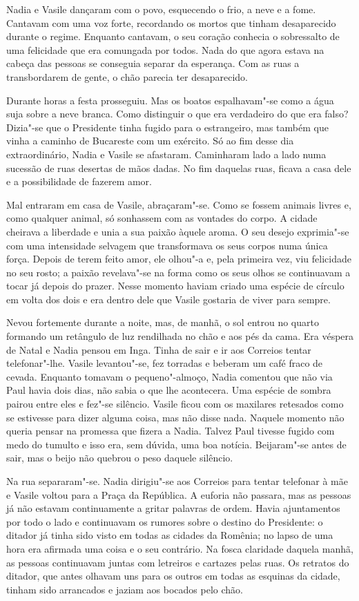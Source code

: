 Nadia e Vasile dançaram com o povo, esquecendo o frio, a neve e a fome.
Cantavam com uma voz forte, recordando os mortos que tinham
desaparecido durante o regime. Enquanto cantavam, o seu coração conhecia
o sobressalto de uma felicidade que era comungada por todos. Nada do que
agora estava na cabeça das pessoas se conseguia separar da esperança.
Com as ruas a transbordarem de gente, o chão parecia ter desaparecido.

Durante horas a festa prosseguiu. Mas os boatos espalhavam"-se como a
água suja sobre a neve branca. Como distinguir o que era verdadeiro do
que era falso? Dizia"-se que o Presidente tinha fugido para o
estrangeiro, mas também que vinha a caminho de Bucareste com um exército. Só ao fim desse dia extraordinário, Nadia e Vasile se afastaram.
Caminharam lado a lado numa sucessão de ruas desertas de mãos dadas. No
fim daquelas ruas, ficava a casa dele e a possibilidade de fazerem amor.

Mal entraram em casa de Vasile, abraçaram"-se. Como se fossem animais
livres e, como qualquer animal, só sonhassem com as vontades do corpo. A
cidade cheirava a liberdade e unia a sua paixão àquele aroma. O seu
desejo exprimia"-se com uma intensidade selvagem que transformava os seus
corpos numa única força. Depois de
terem feito amor, ele olhou"-a e, pela primeira vez, viu felicidade no
seu rosto; a paixão revelava"-se na forma como os seus olhos se
continuavam a tocar já depois do prazer. Nesse momento haviam criado uma
espécie de círculo em volta dos dois e era dentro dele que Vasile
gostaria de viver para sempre.

Nevou fortemente durante a noite, mas, de manhã, o sol entrou no quarto
formando um retângulo de luz rendilhada no chão e aos pés da cama.
Era véspera de Natal e Nadia pensou em Inga. Tinha de sair e ir aos
Correios tentar telefonar"-lhe. Vasile levantou"-se, fez torradas e beberam um café fraco de cevada. Enquanto tomavam o pequeno"-almoço, Nadia
comentou que não via Paul havia dois dias, não sabia o que lhe
acontecera. Uma espécie de sombra pairou entre eles e fez"-se silêncio.
Vasile ficou com os maxilares retesados como se estivesse para dizer
alguma coisa, mas não disse nada. Naquele momento não queria pensar na
promessa que fizera a Nadia. Talvez Paul tivesse fugido com medo do
tumulto e isso era, sem dúvida, uma boa notícia. Beijaram"-se antes de
sair, mas o beijo não quebrou o peso daquele silêncio.

Na rua separaram"-se. Nadia dirigiu"-se aos Correios
para tentar telefonar à mãe e Vasile voltou para a Praça da República. A
euforia não passara, mas as pessoas já não estavam continuamente a
gritar palavras de ordem. Havia ajuntamentos por todo o lado e
continuavam os rumores sobre o destino do Presidente: o ditador já tinha
sido visto em todas as cidades da Romênia; no lapso de uma hora era
afirmada uma coisa e o seu contrário. Na fosca claridade daquela
manhã, as pessoas continuavam juntas
com letreiros e cartazes pelas ruas. Os retratos do ditador, que antes
olhavam uns para os outros em todas as esquinas da cidade, tinham sido
arrancados e jaziam aos bocados pelo chão.

